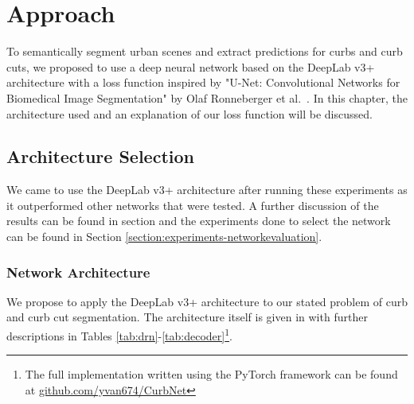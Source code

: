 \chapter{Approach}\label{chap:approach}
To semantically segment urban scenes and extract predictions for curbs and curb cuts, we proposed to use a deep neural network based on the DeepLab v3+ architecture with a loss function inspired by "U-Net: Convolutional Networks for Biomedical Image Segmentation" by Olaf Ronneberger et al.~\cite{unet}.
In this chapter, the architecture used and an explanation of our loss function will be discussed.

\section{Architecture Selection} \label{section:approach-architectureselection}
We came to use the DeepLab v3+ architecture after running these experiments as it outperformed other networks that were tested.
A further discussion of the results can be found in section and the experiments done to select the network can be found in Section \ref{section:experiments-networkevaluation}.

\subsection{Network Architecture}\label{section:approach-networkarchitecture}
We propose to apply the DeepLab v3+ architecture to our stated problem of curb and curb cut segmentation.
The architecture itself is given in  with further descriptions in Tables \ref{tab:drn}-\ref{tab:decoder}\footnote{The full implementation written using the PyTorch framework can be found at \url{github.com/yvan674/CurbNet}}.







